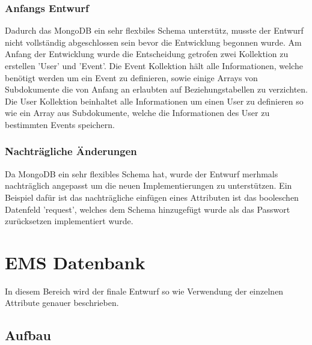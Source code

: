 \subsubsection{Anfangs Entwurf}
Dadurch das MongoDB ein sehr flexbiles Schema unterstütz, musste der Entwurf nicht vollständig abgeschlossen sein bevor die Entwicklung begonnen wurde.
Am Anfang der Entwicklung wurde die Entscheidung getrofen zwei Kollektion zu erstellen 'User' und 'Event'.
Die Event Kollektion hält alle Informationen, welche benötigt werden um ein Event zu definieren, sowie einige Arrays von Subdokumente die von Anfang an erlaubten auf Beziehungstabellen zu verzichten.
Die User Kollektion beinhaltet alle Informationen um einen User zu definieren so wie ein Array aus Subdokumente, welche die Informationen des User zu bestimmten Events speichern. 
\subsubsection{Nachträgliche Änderungen}
Da MongoDB ein sehr flexibles Schema hat, wurde der Entwurf merhmals nachträglich angepasst um die neuen Implementierungen zu unterstützen. 
Ein Beispiel dafür ist das nachträgliche einfügen eines Attributen ist das booleschen Datenfeld 'request', welches dem Schema hinzugefügt wurde als das Passwort zurücksetzen implementiert wurde.			
\newpage
\section{EMS Datenbank}
In diesem Bereich wird der finale Entwurf so wie Verwendung der einzelnen Attribute genauer beschrieben.	
\subsection{Aufbau}

